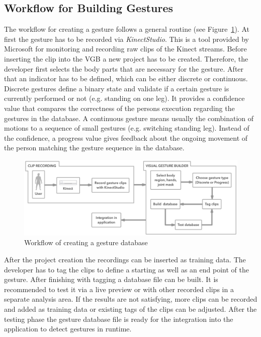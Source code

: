 \subsection{Workflow for Building Gestures}
The workflow for creating a gesture follows a general routine (see Figure~\ref{fig:5_3_gestureCreation}).
At first the gesture has to be recorded via \textit{KinectStudio}.
This is a tool provided by Microsoft for monitoring and recording raw clips of the Kinect streams.
Before inserting the clip into the VGB a new project has to be created.
Therefore, the developer first selects the body parts that are necessary for the gesture.
After that an indicator has to be defined, which can be either discrete or continuous.
Discrete gestures define a binary state and validate if a certain gesture is currently performed or not (e.g. standing on one leg).
It provides a confidence value that compares the correctness of the persons execution regarding the gestures in the database.
A continuous gesture means usually the combination of motions to a sequence of small gestures (e.g. switching standing leg).
Instead of the confidence, a progress value gives feedback about the ongoing movement of the person matching the gesture sequence in the database.
\begin{figure}[htb]
	\centering
	\begin{minipage}[t]{1\linewidth}
		\centering
		\includegraphics[width=1\linewidth]{Pictures/5_3_gestureCreation}
		\caption{Workflow of creating a gesture database}
		\label{fig:5_3_gestureCreation}
	\end{minipage}
\end{figure}

After the project creation the recordings can be inserted as training data.
The developer has to tag the clips to define a starting as well as an end point of the gesture.
After finishing with tagging a database file can be built.
It is recommended to test it via a live preview or with other recorded clips in a separate analysis area.
If the results are not satisfying, more clips can be recorded and added as training data or existing tags of the clips can be adjusted.
After the testing phase the gesture database file is ready for the integration into the application to detect gestures in runtime. %
